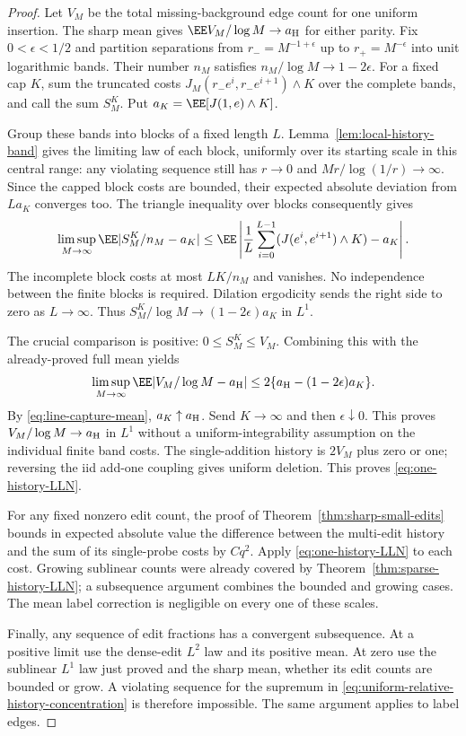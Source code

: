 \documentclass[11pt,letterpaper]{article}
\begin{document}
\begin{proof}
Let $V_M$ be the total missing-background edge count for one
uniform insertion. The sharp mean gives
$\EE V_M/\log M\to a_{\rm H}$ for either parity.
Fix $0<\epsilon<1/2$ and partition separations from
$r_-=M^{-1+\epsilon}$ up to $r_+=M^{-\epsilon}$ into unit
logarithmic bands. Their number $n_M$ satisfies
$n_M/\log M\to1-2\epsilon$.
For a fixed cap $K$, sum the truncated costs
$J_M(r_-e^i,r_-e^{i+1})\wedge K$ over the complete bands,
and call the sum $S_M^K$. Put
$a_K=\EE[J(1,e)\wedge K]$.

Group these bands into blocks of a fixed length $L$.
Lemma~\ref{lem:local-history-band} gives the limiting law of each
block, uniformly over its starting scale in this central range:
any violating sequence still has $r\to0$ and
$Mr/\log(1/r)\to\infty$. Since the capped block costs are bounded,
their expected absolute deviation from $La_K$ converges too.
The triangle inequality over blocks consequently gives
\[
 \limsup_{M\to\infty}\EE|S_M^K/n_M-a_K|
 \le\EE\left|\frac1L\sum_{i=0}^{L-1}
                    (J(e^i,e^{i+1})\wedge K)-a_K\right|.
\]
The incomplete block costs at most $LK/n_M$ and vanishes.
No independence between the finite blocks is required.
Dilation ergodicity sends the right side to zero as $L\to\infty$.
Thus $S_M^K/\log M\to(1-2\epsilon)a_K$ in $L^1$.

The crucial comparison is positive: $0\le S_M^K\le V_M$.
Combining this with the already-proved full mean yields
\[
 \limsup_{M\to\infty}\EE|V_M/\log M-a_{\rm H}|
       \le2\{a_{\rm H}-(1-2\epsilon)a_K\}.
\]
By \eqref{eq:line-capture-mean}, $a_K\uparrow a_{\rm H}$.
Send $K\to\infty$ and then $\epsilon\downarrow0$.
This proves $V_M/\log M\to a_{\rm H}$ in $L^1$ without a
uniform-integrability assumption on the individual finite band costs.
The single-addition history is $2V_M$ plus zero or one;
reversing the iid add-one coupling gives uniform deletion.
This proves \eqref{eq:one-history-LLN}.

For any fixed nonzero edit count, the proof of
Theorem~\ref{thm:sharp-small-edits} bounds in expected absolute value
the difference between the multi-edit history and the sum of its
single-probe costs by $Cq^2$. Apply \eqref{eq:one-history-LLN} to
each cost. Growing sublinear counts were already covered by
Theorem~\ref{thm:sparse-history-LLN}; a subsequence argument combines
the bounded and growing cases. The mean label correction is
negligible on every one of these scales.

Finally, any sequence of edit fractions has a convergent subsequence.
At a positive limit use the dense-edit $L^2$ law and its positive
mean. At zero use the sublinear $L^1$ law just proved and the sharp
mean, whether its edit counts are bounded or grow. A violating
sequence for the supremum in
\eqref{eq:uniform-relative-history-concentration} is therefore
impossible. The same argument applies to label edges.
\end{proof}
\end{document}
